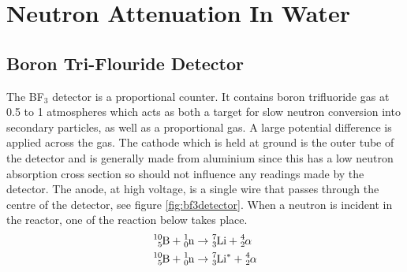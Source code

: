 \section{Neutron Attenuation In Water} %
\label{sec:neutron_attenuation_in_water}

\subsection{Boron Tri-Flouride Detector} %
\label{ssub:boron_tri_flouride_detector}
The BF$_3$ detector is a proportional counter. It contains boron trifluoride gas at 0.5 to 1 atmospheres which acts as both a target for slow neutron conversion into secondary particles, as well as a proportional gas. A large potential difference is applied across the gas. The cathode which is held at ground is the outer tube of the detector and is generally made from aluminium since this has a low neutron absorption cross section so should not influence any readings made by the detector. The anode, at high voltage, is a single wire that passes through the centre of the detector, see figure \ref{fig:bf3detector}. When a neutron is incident in the reactor, one of the reaction below takes place\cite{krane}.
\begin{align}
	\cf{^{10}_{5}B} + \cf{^{1}_{0}n} &\rightarrow \cf{^{7}_{3}Li} + \cf{^{4}_{2}\alpha} \label{eq:bf31}\\
	\cf{^{10}_{5}B} + \cf{^{1}_{0}n} &\rightarrow \cf{^{7}_{3}Li^*} + \cf{^{4}_{2}\alpha} \label{eq:bf32}
\end{align} 

